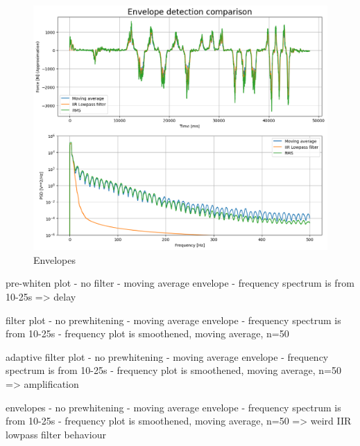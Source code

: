 \begin{figure}[h!t]
	\begin{center}
		\includegraphics[width=0.8\columnwidth]{images/measurement_envelopes.png}
	\end{center}
	\caption{Envelopes}
	\label{fig:result_envelopes}
\end{figure}

pre-whiten plot
- no filter
- moving average envelope
- frequency spectrum is from 10-25s
=> delay

filter plot
- no prewhitening
- moving average envelope
- frequency spectrum is from 10-25s
- frequency plot is smoothened, moving average, n=50

adaptive filter plot
- no prewhitening
- moving average envelope
- frequency spectrum is from 10-25s
- frequency plot is smoothened, moving average, n=50
=> amplification 

envelopes
- no prewhitening
- moving average envelope
- frequency spectrum is from 10-25s
- frequency plot is smoothened, moving average, n=50
=> weird IIR lowpass filter behaviour
